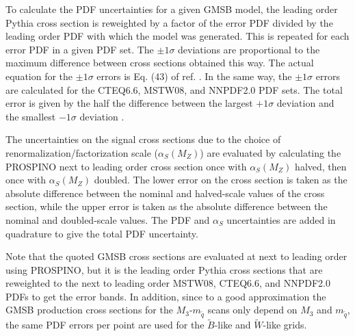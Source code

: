 \documentclass[dissertation.tex]{subfiles}
\begin{document}
To calculate the PDF uncertainties for a given GMSB model, the leading order Pythia cross section is reweighted by a factor of the error PDF divided by the leading order PDF with which the model was generated.  This is repeated for each error PDF in a given PDF set.  The $\pm1\sigma$ deviations are proportional to the maximum difference between cross sections obtained this way.  The actual equation for the $\pm1\sigma$ errors is Eq. (43) of ref. \cite{PDF_primer}.  In the same way, the $\pm1\sigma$ errors are calculated for the CTEQ6.6, MSTW08, and NNPDF2.0 PDF sets.  
The total error is given by the half the difference between the largest $+1\sigma$ deviation and the smallest $-1\sigma$ deviation \cite{PDF4LHC}.

The uncertainties on the signal cross sections due to the choice of renormalization/factorization scale ($\alpha_{S}(M_{Z})$) are evaluated by calculating the PROSPINO next to leading order cross section once with $\alpha_{S}(M_{Z})$ halved, then once with $\alpha_{S}(M_{Z})$ doubled.  The lower error on the cross section is taken as the absolute difference between the nominal and halved-scale values of the cross section, while the upper error is taken as the absolute difference between the nominal and doubled-scale values.  The PDF and $\alpha_{S}$ uncertainties are added in quadrature to give the total PDF uncertainty.

Note that the quoted GMSB cross sections are evaluated at next to leading order using PROSPINO, but it is the leading order Pythia cross sections that are reweighted to the next to leading order MSTW08, CTEQ6.6, and NNPDF2.0 PDFs to get the error bands.  In addition, since to a good approximation the GMSB production cross sections for the $M_{3}$-$m_{\tilde{q}}$ scans only depend on $M_{3}$ and $m_{\tilde{q}}$, the same PDF errors per point are used for the $\tilde{B}$-like and $\tilde{W}$-like grids.
\end{document}
